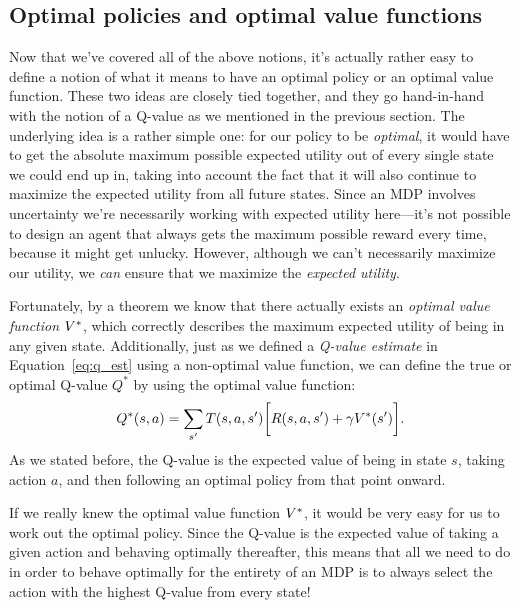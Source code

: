 \documentclass[a4paper]{article}
\begin{document}
\subsection{Optimal policies and optimal value functions} \label{ssec:optimal}
Now that we've covered all of the above notions, it's actually rather easy
to define a notion of what it means to have an optimal policy
or an optimal value function.
These two ideas are closely tied together, and they go hand-in-hand with
the notion of a Q-value as we mentioned in the previous section.
The underlying idea is a rather simple one:
for our policy to be \emph{optimal},
it would have to get the absolute maximum possible expected utility
out of every single state we could end up in,
taking into account the fact that it will also continue to maximize
the expected utility from all future states.
Since an MDP involves uncertainty we're necessarily working with
expected utility here---it's not possible to design an agent that
always gets the maximum possible reward every time, because it
might get unlucky.
However, although we can't necessarily maximize our utility, we \emph{can}
ensure that we maximize the \emph{expected utility}.

Fortunately, by a theorem we know that there actually exists an
\emph{optimal value function} $V^*$, which correctly describes the maximum
expected utility of being in any given state. Additionally, just as we
defined a \emph{Q-value estimate} in Equation~\ref{eq:q_est} using a non-optimal
value function,
we can define the true or optimal Q-value $Q^*$ by using the optimal value
function:
\begin{equation} \label{eq:q}
  Q^*(s, a) = \sum_{s'} T(s, a, s') \bigg[ R(s, a, s') + \gamma V^*(s') \bigg] .
\end{equation}
As we stated before, the Q-value is the expected value of being in state $s$,
taking action $a$, and then following an optimal policy from that point onward.

If we really knew the optimal value function $V^*$, it would be very easy for
us to work out the optimal policy.
Since the Q-value is the expected value of taking a given action and behaving
optimally thereafter, this means that all we need to do in order to behave
optimally for the entirety of an MDP is to always select the action with the
highest Q-value from every state!
\end{document}
